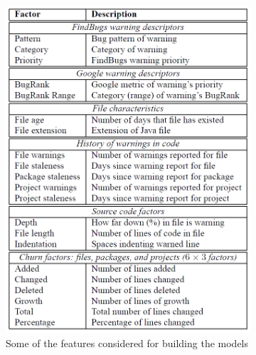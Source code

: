  \begin{figure}[H]
     \begin{subfigure}{.5\textwidth}
         \centering
         \includegraphics[scale=0.3]{./src/actionable_warnings_metrics.png}
         \caption{Some of the features considered for building the models}\label{act:metrics}
     \end{subfigure}%
     \begin{subfigure}{.5\textwidth}
         \centering

\end{subfigure}
\end{figure}
